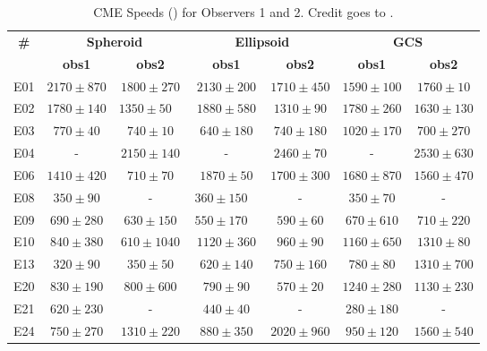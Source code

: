 \begin{table}[!htp]
	\caption{CME Speeds (\kms) for Observers 1 and 2. Credit goes to \citet{miteva_2023}.}
	\label{tab_fits}
	\centering
	\begin{tabular}{ccccccc}
		\toprule
		\textbf{\#} & \multicolumn{2}{c}{\textbf{Spheroid}} & \multicolumn{2}{c}{\textbf{Ellipsoid}} & \multicolumn{2}{c}{\textbf{GCS}} \\
		& \textbf{obs1} & \textbf{obs2} & \textbf{obs1} & \textbf{obs2} & \textbf{obs1} & \textbf{obs2} \\
		\midrule
		E01 & $2170\pm870$ & $1800\pm270$ & $2130\pm200$ & $1710\pm450$ & $1590\pm100$ & $1760\pm10$ \\
		E02 & $1780\pm140$ & $1350\pm50$  & $1880\pm580$ & $1310\pm90$ & $1780\pm260$ & $1630\pm130$ \\
		E03 & $770\pm40$ & $740\pm10$ & $640\pm180$ & $740\pm180$ & $1020\pm170$ & $700\pm270$ \\
		E04 & - & $2150\pm140$ & - & $2460\pm70$ & - & $2530\pm630$ \\
		E06 & $1410\pm420$ & $710\pm70$ & $1870\pm50$ & $1700\pm300$ & $1680\pm870$ & $1560\pm470$ \\
		E08 & $350\pm90$ & - & $360\pm150$  & - & $350\pm70$ & - \\
		E09 & $690\pm280$ & $630\pm150$ & $550\pm170$  & $590\pm60$ & $670\pm610$ & $710\pm220$ \\
		E10 & $840\pm380$ & $610\pm1040$ & $1120\pm360$ & $960\pm90$ & $1160\pm650$ & $1310\pm80$ \\
		E13 & $320\pm90$ & $350\pm50$ & $620\pm140$ & $750\pm160$ & $780\pm80$ & $1310\pm700$ \\
		E20 & $830\pm190$ & $800\pm600$ & $790\pm90$ & $570\pm20$ & $1240\pm280$ & $1130\pm230$ \\
		E21 & $620\pm230$ & - & $440\pm40$ & - & $280\pm180$ & - \\
		E24 & $750\pm270$ & $1310\pm220$ & $880\pm350$ & $2020\pm960$ & $950\pm120$ & $1560\pm540$ \\
		\bottomrule
	\end{tabular}
\end{table}

